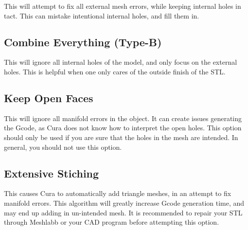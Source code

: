 This will attempt to fix all external mesh errors, while keeping internal holes in tact. This can mistake intentional internal holes, and fill them in.

\subsection{Combine Everything (Type-B)}

This will ignore all internal holes of the model, and only focus on the external holes. This is helpful when one only cares of the outside finish of the STL.

\subsection{Keep Open Faces}

This will ignore all manifold errors in the object. It can create issues generating the Gcode, as Cura does not know how to interpret the open holes. This option should only be used if you are sure that the holes in the mesh are intended. In general, you should not use this option.

\subsection{Extensive Stiching}

This causes Cura to automatically add triangle meshes, in an attempt to fix manifold errors. This algorithm will greatly increase Gcode generation time, and may end up adding in un-intended mesh. It is recommended to repair your STL through Meshlabb or your CAD program before attempting this option.
